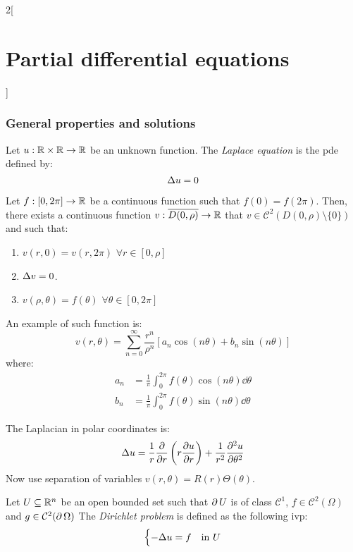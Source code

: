 \documentclass[../../../main_math.tex]{subfiles}
\begin{document}
\begin{multicols}{2}[\section{Partial differential equations}]
  \subsubsection{General properties and solutions}
  \begin{definition}
    Let $u:\mathbb{R}\times\mathbb{R}\rightarrow\mathbb{R}$ be an unknown function. The \emph{Laplace equation} is the pde defined by: $$\Delta u=0$$
  \end{definition}
  \begin{proposition}
    Let $f:[0,2\pi]\rightarrow\mathbb{R}$ be a continuous function such that $f(0)=f(2\pi)$. Then, there exists a continuous function $v:\overline{D(0,\rho)}\rightarrow\mathbb{R}$ that $v\in\mathcal{C}^2(D(0,\rho)\setminus\{0\})$ and such that:
    \begin{enumerate}
      \item $v(r,0)=v(r,2\pi)$ $\forall r\in[0,\rho]$
      \item $\Delta v=0$.
      \item $v(\rho,\theta)=f(\theta)$ $\forall\theta\in[0,2\pi]$
    \end{enumerate}
    An example of such function is:
    $$v(r,\theta)=\sum_{n=0}^\infty \frac{r^n}{\rho^n}\left[a_n\cos\left(n\theta\right)+ b_n\sin\left(n\theta\right)\right]$$ where:
    \begin{align*}
      a_n & =\frac{1}{\pi}\int_{0}^{2\pi} f(\theta)\cos\left(n\theta\right)\dd{\theta} \\
      b_n & =\frac{1}{\pi}\int_{0}^{2\pi} f(\theta)\sin\left(n\theta\right)\dd{\theta}
    \end{align*}
  \end{proposition}
  \begin{sproof}
    The Laplacian in polar coordinates is: $$\Delta u=\frac{1}{r}\pdv{}{r}\left(r\pdv{u}{r}\right)+\frac{1}{r^2}\pdv[2]{u}{\theta}$$ Now use separation of variables $v(r,\theta)=R(r)\Theta(\theta)$.
  \end{sproof}
  \begin{definition}
    Let $U\subseteq \mathbb{R}^n$ be an open bounded set such that $\operatorname{\partial}{U}$ is of class $\mathcal{C}^1$, $f\in\mathcal{C}^2(\Omega)$ and $g\in\mathcal{C}^2(\operatorname{\partial}{\Omega})$ The \emph{Dirichlet problem} is defined as the following ivp:
    \begin{equation}\label{PDE:dirichlet}
      \begin{cases}
        -\Delta{u} = f & \text{in $U$}      \\

\end{cases}
\end{equation}
\end{definition}
\end{multicols}
\end{document}
